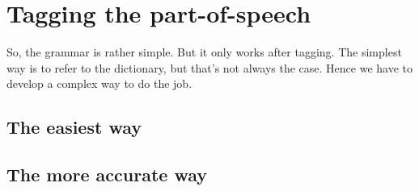\section{Tagging the part-of-speech}

So, the grammar is rather simple. But it only works after tagging. 
The simplest way is to refer to the dictionary, but that's not always the case. Hence we have to develop a complex way to do the job.

\subsection{The easiest way}

\subsection{The more accurate way}
